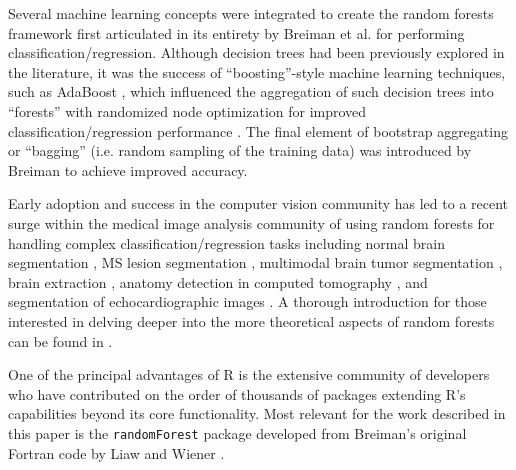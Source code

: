 \documentclass[final,5p,times,twocolumn]{elsarticle}
\begin{document}

Several machine learning concepts were integrated to create 
the random forests framework first articulated in its entirety by Breiman
et al. \cite{breiman2001} for performing classification/regression.  
Although decision trees had been previously explored in the literature, 
it was the success of ``boosting''-style machine learning 
techniques, such as AdaBoost \cite{schapire1990,freund1997}, which influenced 
the aggregation of such decision trees into ``forests'' 
with randomized node optimization for improved
classification/regression performance \cite{ho1995,amit1997}.
The final element of bootstrap aggregating or ``bagging'' (i.e.
random sampling of the training data) was
introduced by Breiman \cite{breiman1996} to achieve improved
accuracy.  

Early adoption \cite{viola2005} and success in the
computer vision community
has led to a recent surge within the medical image analysis
community of using random forests for handling complex 
classification/regression tasks including
normal brain segmentation \cite{yi2009},
MS lesion segmentation \cite{geremia2011}, 
multimodal brain tumor segmentation
\cite{bauer2012,zikic2012}, brain extraction \cite{iglesias2010}, 
anatomy detection in computed tomography \cite{criminisi2013}, and
segmentation of echocardiographic images \cite{verhoek2011}. 
A thorough introduction for those interested in delving deeper 
into the more theoretical aspects of random forests can be found
in \cite{criminisi2011}.

One of the principal advantages of R is the extensive community of
developers  who have contributed on the order of thousands of packages 
extending R's capabilities beyond its core functionality.
Most relevant for the work described in this paper
is the \verb#randomForest# package developed from Breiman's original
Fortran code by Liaw and Wiener \citep{liaw2002}.
\end{document}
